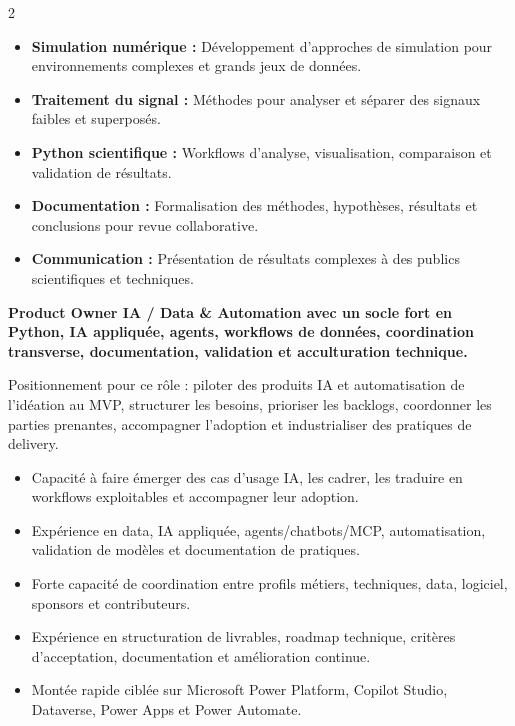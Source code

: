 \documentclass[8pt,a4paper,ragged2e,withhyper]{altacv}
\begin{document}
\begin{paracol}{2}
\begin{itemize}
  \item \textbf{Simulation numérique :} Développement d’approches de simulation pour environnements complexes et grands jeux de données.
  \item \textbf{Traitement du signal :} Méthodes pour analyser et séparer des signaux faibles et superposés.
  \item \textbf{Python scientifique :} Workflows d’analyse, visualisation, comparaison et validation de résultats.
  \item \textbf{Documentation :} Formalisation des méthodes, hypothèses, résultats et conclusions pour revue collaborative.
  \item \textbf{Communication :} Présentation de résultats complexes à des publics scientifiques et techniques.
\end{itemize}

\switchcolumn


\textbf{Product Owner IA / Data \& Automation avec un socle fort en Python, IA appliquée, agents, workflows de données, coordination transverse, documentation, validation et acculturation technique.}

Positionnement pour ce rôle : piloter des produits IA et automatisation de l’idéation au MVP, structurer les besoins, prioriser les backlogs, coordonner les parties prenantes, accompagner l’adoption et industrialiser des pratiques de delivery.

\begin{itemize}
  \item Capacité à faire émerger des cas d’usage IA, les cadrer, les traduire en workflows exploitables et accompagner leur adoption.
  \item Expérience en data, IA appliquée, agents/chatbots/MCP, automatisation, validation de modèles et documentation de pratiques.
  \item Forte capacité de coordination entre profils métiers, techniques, data, logiciel, sponsors et contributeurs.
  \item Expérience en structuration de livrables, roadmap technique, critères d’acceptation, documentation et amélioration continue.
  \item Montée rapide ciblée sur Microsoft Power Platform, Copilot Studio, Dataverse, Power Apps et Power Automate.
\end{itemize}



\end{paracol}
\end{document}
